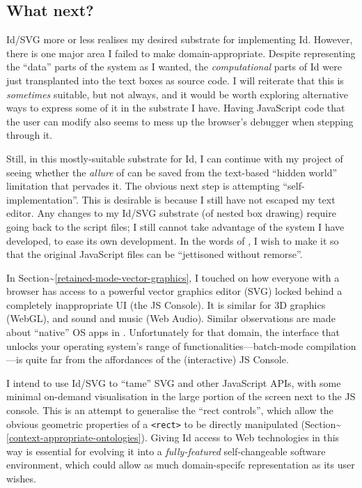 \hypertarget{what-next}{%
\subsection{What next?}\label{what-next}}

Id{}/SVG more or less realises my desired substrate for implementing
Id{}. However, there is one major area I failed to make
domain-appropriate. Despite representing the ``data'' parts of the
system as I wanted, the \emph{computational} parts of Id{} were just
transplanted into the text boxes as source code. I will reiterate that
this is \emph{sometimes} suitable, but not always, and it would be worth
exploring alternative ways to express some of it in the substrate I
have. Having JavaScript code that the user can modify also seems to mess
up the browser's debugger when stepping through it.

Still, in this mostly-suitable substrate for Id{}, I can continue with
my project of seeing whether the \emph{allure} of \cite{COLAs} can be
saved from the text-based ``hidden world'' limitation that pervades it.
The obvious next step is attempting ``self-implementation''. This is
desirable is because I still have not escaped my text editor. Any
changes to my Id{}/SVG substrate (of nested box drawing) require going
back to the script files; I still cannot take advantage of the system I
have developed, to ease its own development. In the words of
\cite{COLAs}, I wish to make it so that the original JavaScript files
can be ``jettisoned without remorse''.

In Section\textasciitilde{}\ref{retained-mode-vector-graphics}, I
touched on how everyone with a browser has access to a powerful vector
graphics editor (SVG) locked behind a completely inappropriate UI (the
JS Console). It is similar for 3D graphics (WebGL), and sound and music
(Web Audio). Similar observations are made about ``native'' OS apps in
\cite{prog21-dyn}. Unfortunately for that domain, the interface that
unlocks your operating system's range of functionalities---batch-mode
compilation---is quite far from the affordances of the (interactive) JS
Console.

I intend to use Id{}/SVG to ``tame'' SVG and other JavaScript APIs, with
some minimal on-demand visualisation in the large portion of the screen
next to the JS console. This is an attempt to generalise the ``rect
controls'', which allow the obvious geometric properties of a
\texttt{\textless{}rect\textgreater{}} to be directly manipulated
(Section\textasciitilde{}\ref{context-appropriate-ontologies}). Giving
Id{} access to Web technologies in this way is essential for evolving it
into a \emph{fully-featured} self-changeable software environment, which
could allow as much domain-specifc representation as its user wishes.
